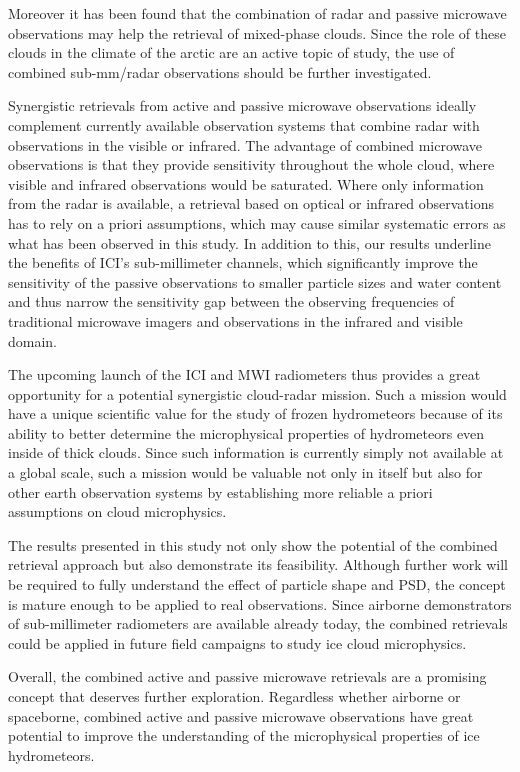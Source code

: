 \documentclass[journal abbreviation, manuscript]{copernicus}
\begin{document}
Moreover it has been found that the combination of radar and passive microwave
observations may help the retrieval of mixed-phase clouds. Since the role of
these clouds in the climate of the arctic are an active topic of study, the use
of combined sub-mm/radar observations should be further investigated.

Synergistic retrievals from active and passive microwave observations ideally
complement currently available observation systems that combine radar with
observations in the visible or infrared. The advantage of combined microwave
observations is that they provide sensitivity throughout the whole cloud, where
visible and infrared observations would be saturated. Where only information
from the radar is available, a retrieval based on optical or infrared
observations has to rely on a priori assumptions, which may cause similar
systematic errors as what has been observed in this study. In addition to this,
our results underline the benefits of ICI's sub-millimeter channels, which
significantly improve the sensitivity of the passive observations to smaller
particle sizes and water content and thus narrow the sensitivity gap between
the observing frequencies of traditional microwave imagers and observations in
the infrared and visible domain.

The upcoming launch of the ICI and MWI radiometers thus provides a great
opportunity for a potential synergistic cloud-radar mission. Such a mission
would have a unique scientific value for the study of frozen hydrometeors
because of its ability to better determine the microphysical properties of
hydrometeors even inside of thick clouds. Since such information is currently
simply not available at a global scale, such a mission would be valuable not
only in itself but also for other earth observation systems by establishing more
reliable a priori assumptions on cloud microphysics.

The results presented in this study not only show the potential of the combined
retrieval approach but also demonstrate its feasibility. Although further work
will be required to fully understand the effect of particle shape and PSD, the
concept is mature enough to be applied to real observations. Since airborne
demonstrators of sub-millimeter radiometers are available already today, the
combined retrievals could be applied in future field campaigns to study ice
cloud microphysics.

Overall, the combined active and passive microwave retrievals are a promising
concept that deserves further exploration. Regardless whether airborne or
spaceborne, combined active and passive microwave observations have great
potential to improve the understanding of the microphysical properties of ice
hydrometeors.
\end{document}
